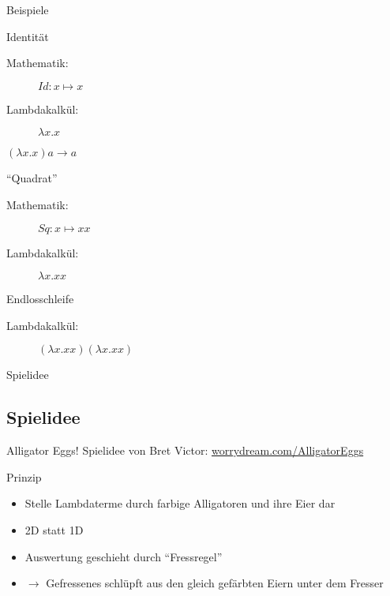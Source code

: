 \documentclass[18pt]{beamer}
\begin{document}
	\begin{frame}{Beispiele}
		\begin{exampleblock}{Identität}
			\begin{description}
				\item[Mathematik:] $Id: x \mapsto x$
				\item[Lambdakalkül:] $\lambda x.x$
			\end{description}
			$(\lambda x.x) a \rightarrow a$
		\end{exampleblock}
		\pause
		\begin{exampleblock}{"`Quadrat"'}
			\begin{description}
				\item[Mathematik:] $Sq: x \mapsto x x$
				\item[Lambdakalkül:] $\lambda x.x x$
			\end{description}
		\end{exampleblock}
		\pause
		\begin{exampleblock}{Endlosschleife}
			\begin{description}
				\item[Lambdakalkül:] $(\lambda x.x x)(\lambda x.x x)$
			\end{description}
		\end{exampleblock}
	\end{frame}

	\begin{frame}{Spielidee}
	\end{frame}

	\subsection{Spielidee}
	\begin{frame}[<+->]{Alligator Eggs!}
		Spielidee von Bret Victor: \textcolor{blue}{\href{/http://worrydream.com/AlligatorEggs}{worrydream.com/AlligatorEggs}}
		\begin{block}{Prinzip}
			\begin{itemize}
				\item Stelle Lambdaterme durch farbige Alligatoren und ihre Eier dar
				\item 2D statt 1D
				\item Auswertung geschieht durch "`Fressregel"'
				\item $\rightarrow$ Gefressenes schlüpft aus den gleich gefärbten Eiern unter dem Fresser
			\end{itemize}
		\end{block}
	\end{frame}
\end{document}
